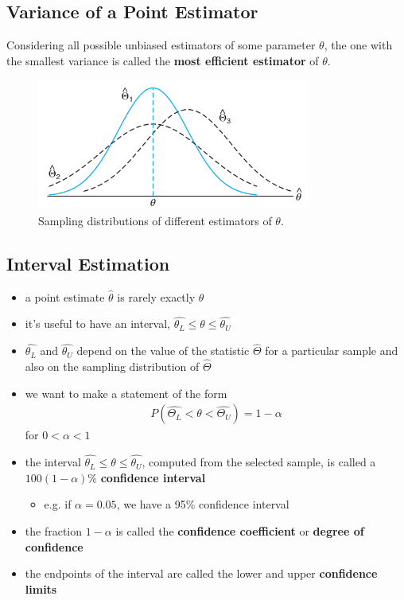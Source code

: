\documentclass[10pt]{article}
\begin{document}
\subsection{Variance of a Point Estimator}
\begin{definition}
    Considering all possible unbiased estimators of some parameter $\theta$, the one with the smallest variance is called the \textbf{most efficient estimator} of $\theta$.
\end{definition}
\begin{figure}[h]
    \centering
    \includegraphics[width=0.8\textwidth]{unbiasedEstimator}
    \caption{Sampling distributions of different estimators of $\theta$.}
    \label{fig:unbiasedEstimator}
\end{figure}

\subsection{Interval Estimation}
\begin{itemize}
    \item a point estimate $\hat{\theta}$ is rarely exactly $\theta$ 
    \item it's useful to have an interval, $\hat{\theta_L} \le \theta \le \hat{\theta_U}$
    \item $\hat{\theta_L}$ and $\hat{\theta_U}$ depend on the value of the statistic $\hat{\Theta}$ for a particular sample and also on the sampling distribution of $\hat{\Theta}$
    \item we want to make a statement of the form 
        \begin{gather*}
            P(\hat{\Theta_L} < \theta < \hat{\Theta_U}) = 1 - \alpha
        \end{gather*}
        for $0 < \alpha < 1$
    \item the interval $\hat{\theta_L} \le \theta \le \hat{\theta_U}$, computed from the selected sample, is called a $100(1-\alpha)\%$ \textbf{confidence interval} 
        \begin{itemize}
            \item e.g. if $\alpha = 0.05$, we have a 95\% confidence interval 
        \end{itemize}
    \item the fraction $1-\alpha$ is called the \textbf{confidence coefficient} or \textbf{degree of confidence}
    \item the endpoints of the interval are called the lower and upper \textbf{confidence limits} 
\end{itemize}
\end{document}
